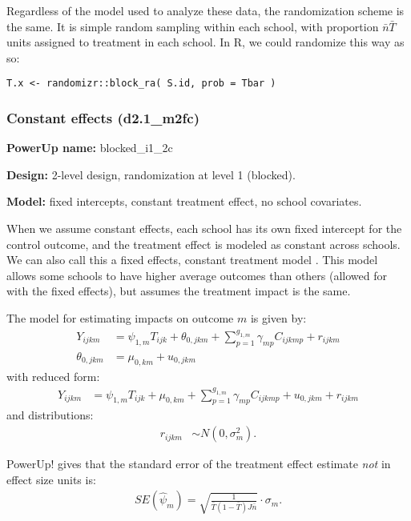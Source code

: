 \documentclass[12pt]{article}
\begin{document}
Regardless of the model used to analyze these data, the randomization scheme is the same.
It is simple random sampling within each school, with proportion $\bar{n}\bar{T}$ units assigned to treatment in each school.
In R, we could randomize this way as so:
\begin{verbatim}
T.x <- randomizr::block_ra( S.id, prob = Tbar )
\end{verbatim}



\subsubsection{Constant effects (d2.1\_m2fc)}

\textbf{PowerUp name:} blocked\_i1\_2c

\textbf{Design:} 2-level design, randomization at level 1 (blocked).

\textbf{Model:} fixed intercepts, constant treatment effect, no school covariates.

When we assume constant effects, each school has its own fixed intercept for the control outcome, and the treatment effect is modeled as constant across schools.
We can also call this a fixed effects, constant treatment model \citep{Miratrix2020}.
This model allows some schools to have higher average outcomes than others (allowed for with the fixed effects), but assumes the treatment impact is the same.

The model for estimating impacts on outcome $m$ is given by:
\begin{align}
Y_{ijkm} &= \psi_{1,m} T_{ijk} + \theta_{0,jkm} + \sum_{p=1}^{g_{1,m}} \gamma_{mp} C_{ijkmp} + r_{ijkm}\\
\nonumber \theta_{0,jkm} &= \mu_{0,km} + u_{0,jkm}
\end{align}
with reduced form:
\begin{align}
Y_{ijkm} &= \psi_{1,m} T_{ijk} + \mu_{0,km} + \sum_{p=1}^{g_{1,m}} \gamma_{mp} C_{ijkmp} + u_{0,jkm} + r_{ijkm}
\end{align}
and distributions:
\begin{align}
r_{ijkm} &\sim N\left(0, \sigma^2_m\right).
\end{align}

PowerUp! gives that the standard error of the treatment effect estimate \emph{not} in effect size units is:
\begin{align}SE( \hat{\psi}_m ) = \sqrt{\frac{1}{\bar{T}(1 - \bar{T}) J \bar{n}}} \cdot \sigma_m .\end{align}
\end{document}
